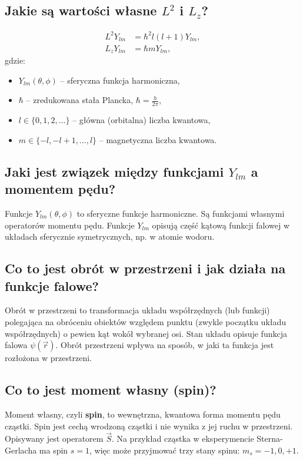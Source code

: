 \subsection{Jakie są wartości własne $L^2$ i $L_z$?}

\begin{align*}
L^2 Y_{lm} &= \hbar^2 l(l+1) Y_{lm}, \\
L_z Y_{lm} &= \hbar m Y_{lm},
\end{align*}
gdzie:
\begin{itemize}
  \item \( Y_{lm}(\theta, \phi) \) -- sferyczna funkcja harmoniczna,
  \item \( \hbar \) -- zredukowana stała Plancka, \( \hbar = \frac{h}{2\pi} \),
  \item \( l \in \{0, 1, 2, \ldots\} \) -- główna (orbitalna) liczba kwantowa,
  \item \( m \in \{-l, -l+1, \ldots, l\} \) -- magnetyczna liczba kwantowa.
\end{itemize}

\subsection{Jaki jest związek między funkcjami $Y_{lm}$ a momentem pędu?}

Funkcje \( Y_{lm}(\theta, \phi) \) to sferyczne funkcje harmoniczne. Są funkcjami własnymi operatorów momentu pędu. Funkcje \( Y_{lm} \) opisują część kątową funkcji falowej w układach sferycznie symetrycznych, np. w atomie wodoru.

\subsection{Co to jest obrót w przestrzeni i jak działa na funkcje falowe?}

Obrót w przestrzeni to transformacja układu współrzędnych (lub funkcji) polegająca na obróceniu obiektów względem punktu (zwykle początku układu współrzędnych) o pewien kąt wokół wybranej osi. Stan układu opisuje funkcja falowa $\psi(\vec{r})$. Obrót przestrzeni wpływa na sposób, w jaki ta funkcja jest rozłożona w przestrzeni.

\subsection{Co to jest moment własny (spin)?}

Moment własny, czyli \textbf{spin}, to wewnętrzna, kwantowa forma momentu pędu cząstki. Spin jest cechą wrodzoną cząstki i nie wynika z jej ruchu w przestrzeni. Opisywany jest operatorem $\vec{S}$. Na przykład cząstka w eksperymencie Sterna-Gerlacha ma spin \( s = 1 \), więc może przyjmować trzy stany spinu: \( m_s = -1, 0, +1 \).

